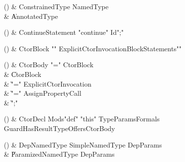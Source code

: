 \begin{bbgrammarappendix}

() & ConstrainedType \label{prod:ConstrainedType}  \: NamedType  \\

 &    \| AnnotatedType \\

\end{bbgrammarappendix}

\begin{bbgrammarappendix}

() & ContinueStatement \label{prod:ContinueStatement}  \: \xcd"continue" Id\opt \xcd";"  \\


\end{bbgrammarappendix}

\begin{bbgrammarappendix}

() & CtorBlock \label{prod:CtorBlock}  \: \xcd"{" ExplicitCtorInvocation\opt BlockStatements\opt \xcd"}"  \\


\end{bbgrammarappendix}

\begin{bbgrammarappendix}

() & CtorBody \label{prod:CtorBody}  \: \xcd"=" CtorBlock  \\

 &    \| CtorBlock \\
 &    \| \xcd"=" ExplicitCtorInvocation \\
 &    \| \xcd"=" AssignPropertyCall \\
 &    \| \xcd";" \\

\end{bbgrammarappendix}

\begin{bbgrammarappendix}

() & CtorDecl \label{prod:CtorDecl}  \: Mods\opt \xcd"def" \xcd"this" TypeParams\opt Formals Guard\opt HasResultType\opt Offers\opt CtorBody  \\


\end{bbgrammarappendix}

\begin{bbgrammarappendix}

() & DepNamedType \label{prod:DepNamedType}  \: SimpleNamedType DepParams  \\

 &    \| ParamizedNamedType DepParams \\

\end{bbgrammarappendix}

